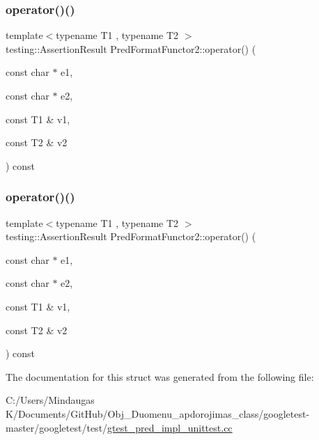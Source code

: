 \mbox{\label{struct_pred_format_functor2_a0169e0105e15d5c63bece2a20646b22b}} 
\subsubsection{\texorpdfstring{operator()()}{operator()()}\hspace{0.1cm}{\footnotesize\ttfamily [2/3]}}
{\footnotesize\ttfamily template$<$typename T1 , typename T2 $>$ \\
testing\+::\+Assertion\+Result Pred\+Format\+Functor2\+::operator() (\begin{DoxyParamCaption}\item[{const char $\ast$}]{e1,  }\item[{const char $\ast$}]{e2,  }\item[{const T1 \&}]{v1,  }\item[{const T2 \&}]{v2 }\end{DoxyParamCaption}) const\hspace{0.3cm}{\ttfamily [inline]}}

\mbox{\label{struct_pred_format_functor2_a0169e0105e15d5c63bece2a20646b22b}} 
\subsubsection{\texorpdfstring{operator()()}{operator()()}\hspace{0.1cm}{\footnotesize\ttfamily [3/3]}}
{\footnotesize\ttfamily template$<$typename T1 , typename T2 $>$ \\
testing\+::\+Assertion\+Result Pred\+Format\+Functor2\+::operator() (\begin{DoxyParamCaption}\item[{const char $\ast$}]{e1,  }\item[{const char $\ast$}]{e2,  }\item[{const T1 \&}]{v1,  }\item[{const T2 \&}]{v2 }\end{DoxyParamCaption}) const\hspace{0.3cm}{\ttfamily [inline]}}



The documentation for this struct was generated from the following file\+:\begin{DoxyCompactItemize}
\item 
C\+:/\+Users/\+Mindaugas K/\+Documents/\+Git\+Hub/\+Obj\+\_\+\+Duomenu\+\_\+apdorojimas\+\_\+class/googletest-\/master/googletest/test/\mbox{\hyperlink{googletest-master_2googletest_2test_2gtest__pred__impl__unittest_8cc}{gtest\+\_\+pred\+\_\+impl\+\_\+unittest.\+cc}}\end{DoxyCompactItemize}
